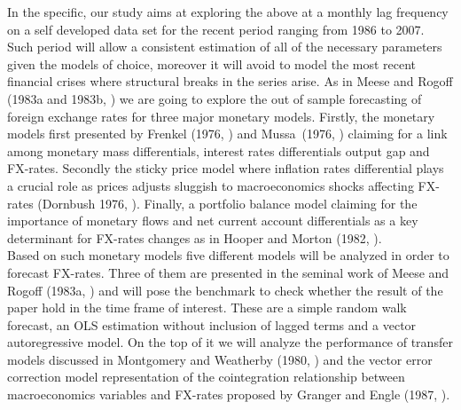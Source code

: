 In the specific, our study aims at exploring the above at a monthly lag frequency on a self developed data set for the recent period ranging from 1986 to 2007. Such period will allow a consistent estimation of all of the necessary parameters given the models of choice, moreover it will avoid to model the most recent financial crises where structural breaks in the series arise.
As in Meese and Rogoff (1983a and 1983b, \cite{MeeseRogoffa,MeeseRogoffb}) we are going to explore the out of sample forecasting of foreign exchange rates for three major monetary models. Firstly, the monetary models first presented by Frenkel (1976, \cite{Frenkel1976}) and  Mussa\ (1976, \cite{Mussa1976}) claiming for a link among monetary mass differentials, interest rates differentials output gap and FX-rates. Secondly the sticky price model where inflation rates differential plays a crucial role as prices adjusts sluggish to macroeconomics shocks affecting FX-rates (Dornbush 1976, \cite{Dornbusch}). Finally, a portfolio balance model claiming for the importance of monetary flows and net current account differentials as a key determinant for FX-rates changes as in Hooper and Morton (1982, \cite{HooperMorton1982}). \\
Based on such monetary models five different models will be analyzed in order to forecast FX-rates. Three of them are presented in the seminal work of Meese and Rogoff (1983a, \cite{MeeseRogoffa}) and will pose the benchmark to check whether the result of the paper hold in the time frame of interest. These are a simple random walk forecast, an OLS estimation without inclusion of lagged terms and a vector autoregressive model. On the top of it we will analyze the performance of transfer models discussed in Montgomery and Weatherby (1980, \cite{MontgomeryWeatherby}) and the vector error correction model representation of the cointegration relationship between macroeconomics variables and FX-rates proposed by Granger and Engle (1987,  \cite{EngleGranger}).




